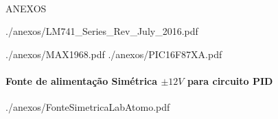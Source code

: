 \paragraph{}
\begin{center}
\huge ANEXOS
\end{center}

 {./anexos/LM741_Series_Rev_July_2016.pdf}
\newpage 

 {./anexos/MAX1968.pdf}
\newpage
 {./anexos/PIC16F87XA.pdf}
\newpage
\paragraph{Fonte de alimentação Simétrica $ \pm 12V $ para circuito PID}
 {./anexos/FonteSimetricaLabAtomo.pdf}


